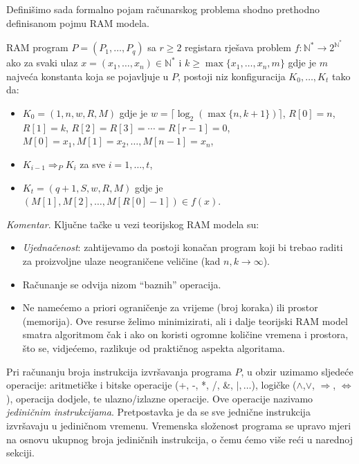 Definišimo sada formalno pojam računarskog problema shodno prethodno definisanom pojmu RAM modela. 
\begin{definition}
	 RAM program $P = (P_1, \ldots, P_q)$ sa $r \geq 2$ registara rješava problem $f \colon \mathbb{N}^* \rightarrow 2^{\mathbb{N}^* } $
	ako za svaki ulaz $x = (x_1,\ldots, x_n) \in \mathbb{N}^* $ i $k \geq \max\{x_1,\ldots, x_n, m\}$ gdje je $m$ najveća konstanta koja se pojavljuje u $P$, postoji niz konfiguracija $K_0,\ldots,K_t$ tako da:
	\begin{itemize}
		\item $K_0 = (1, n, w, R, M)$ gdje je $w = \lceil \log_2(\max\{n, k +1\})\rceil$, $R[0] = n$, $R[1] = k$, $R[2] = R[3] = \cdots =  R[r-1] = 0$, $M[0] = x_1,
		M[1] = x_2, \ldots , M[n - 1] = x_n$,
		\item $K_{i-1} \Rightarrow_P K_i $ za sve $i = 1, \ldots ,t$,
		\item $K_t = (q+1, S, w, R, M)$ gdje je $(M[1], M[2], \ldots , M[R[0] - 1]) \in  f (x)$. 
	\end{itemize}
\end{definition}

\textit{Komentar}.  Ključne tačke u vezi teorijskog RAM modela su:
\begin{itemize}
	\item  \textit{Ujednačenost}: zahtijevamo da postoji konačan program koji bi trebao raditi za proizvoljne ulaze neograničene veličine
(kad $n, k \rightarrow \infty$).
    \item Računanje se odvija nizom “baznih” operacija.
    \item Ne namećemo a priori ograničenje za vrijeme (broj koraka) ili prostor   (memorija). Ove resurse 
      želimo minimizirati, ali i dalje teorijski RAM model  smatra  algoritmom čak i ako on koristi ogromne količine vremena i prostora, što se, vidjećemo, razlikuje od praktičnog aspekta algoritama. 
\end{itemize}

Pri računanju broja instrukcija izvršavanja programa $P$, u obzir uzimamo sljedeće operacije: aritmetičke i bitske operacije (+, -, *, /, \&, $\mid,\ldots $), logičke ($\wedge$,$\vee$, $\Rightarrow$, $\Leftrightarrow$), operacija dodjele, te ulazno/izlazne operacije. Ove operacije nazivamo \textit{jediničnim instrukcijama}.  Pretpostavka je da se sve jednične instrukcija izvršavaju u jediničnom vremenu.  Vremenska složenost programa se upravo mjeri na osnovu ukupnog broja jediničnih instrukcija, o čemu ćemo više reći u narednoj sekciji. 

